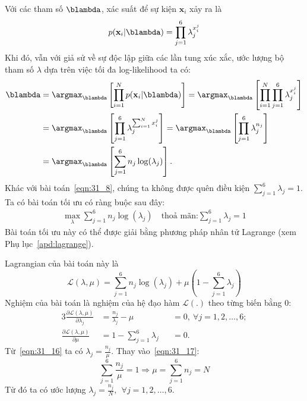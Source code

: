 Với các tham số $\blambda$, xác suất để sự kiện $\mathbf{x}_i$ xảy ra là
\begin{eqnarray} 
  p(\mathbf{x}_i | \blambda) = \prod_{j = 1}^6 \lambda_j^{x_i^j} 
\end{eqnarray} 
Khi đó, vẫn với giả sử về sự độc lập giữa các lần tung xúc xắc, ước lượng bộ
tham số $\lambda$ dựa trên việc tối đa log-likelihood ta có:
\begin{align} 
  \label{eqn:31_10}
  \blambda & =  \argmax_{\blambda} \left[ \prod_{i=1}^N p(\mathbf{x}_i |
  \blambda) \right] 
   =  \argmax_{\blambda} \left[ \prod_{i=1}^N  \prod_{j = 1}^6 \lambda_j^{x_i^j} \right]  \\\ 
  \label{eqn:31_12}
  & =  \argmax_{\blambda} \left[  \prod_{j = 1}^6 \lambda_j^{\sum_{i=1}^N x_i^j} \right] 
   =  \argmax_{\blambda} \left[  \prod_{j = 1}^6 \lambda_j^{n_j} \right]  \\\ 
  \label{eqn:31_14}
  & =  \argmax_{\blambda} \left[  \sum_{j=1}^6 n_j\log(\lambda_j) \right].
\end{align} 
 Khác với bài toán~\eqref{eqn:31_8}, chúng ta không được quên điều kiện
$\sum_{j=1}^6 \lambda_j = 1$. Ta có bài toán tối ưu có ràng buộc sau đây:
\begin{equation}
\label{eqn:31_15}
\begin{aligned} 
  \max_{\lambda}  \sum_{j=1}^6 n_j\log(\lambda_j) \quad 
  \text{thoả mãn:}  \sum_{j=1}^6 \lambda_j = 1
\end{aligned} 
\end{equation}
Bài toán tối ưu này có thể được giải bằng phương pháp nhân tử Lagrange (xem Phụ
lục~\ref{apd:lagrange}).

Lagrangian của bài toán này là
\begin{equation} 
  \mathcal{L}(\lambda, \mu) = \sum_{j=1}^6 n_j\log(\lambda_j) + \mu (1- \sum_{j=1}^6 \lambda_j) 
\end{equation} 
Nghiệm của bài toán là nghiệm của hệ đạo hàm $\mathcal{L}(.)$ theo từng biến bằng 0:
\begin{alignat}{3}
\label{eqn:31_16}
\frac{\partial \mathcal{L}(\lambda, \mu)}{\partial \lambda_j} &=   \frac{n_j}{\lambda_j} - \mu &&=  0,~ \forall j = 1, 2, \dots, 6;\\
\label{eqn:31_17}
\frac{\partial \mathcal{L}(\lambda, \mu)}{\partial \mu} &=  1-\sum_{j=1}^6 \lambda_j &&= 0.
\end{alignat} 
Từ~\eqref{eqn:31_16} ta có $\lambda_j = \frac{n_j}{\mu}$. Thay
vào~\eqref{eqn:31_17}:
\begin{equation} 
  \sum_{j=1}^6 \frac{n_j}{\mu} = 1 \Rightarrow \mu = \sum_{j=1}^6 n_j = N 
\end{equation} 
Từ đó ta có ước lượng 
  $\lambda_j = \frac{n_j}{N}, ~~\forall j = 1, 2, \dots, 6$.
 
